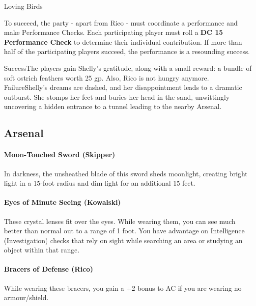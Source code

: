 \begin{DndQuestHook}[width=0.5\textwidth - 4pt]{Loving Birds}
	\DndQuestHookBasics[
		location = {Ostrich Habitat},
		quest-giver = {Shelly, the Ostrich},
		objective = {Perform for Rico's and Shelly's Date},
	]
	
	{\noindent\entryfont To succeed, the party - apart from Rico - must coordinate a performance and make Performance Checks. Each participating player must roll a \textbf{DC 15 Performance Check} to determine their individual contribution. If more than half of the participating players succeed, the performance is a resounding success.}
	
	{%
		{Success}{The players gain Shelly's gratitude, along with a small reward: a bundle of soft ostrich feathers worth 25 gp. Also, Rico is not hungry anymore.}%
		{Failure}{Shelly's dreams are dashed, and her disappointment leads to a dramatic outburst. She stomps her feet and buries her head in the sand, unwittingly uncovering a hidden entrance to a tunnel leading to the nearby Arsenal.}
	}%
\end{DndQuestHook}

\subsection*{ Arsenal}
{\entryfont \paragraph*{Moon-Touched Sword (Skipper)} In darkness, the unsheathed blade of this sword sheds moonlight, creating bright light in a 15-foot radius and dim light for an additional 15 feet.}

{\entryfont \paragraph*{Eyes of Minute Seeing (Kowalski)} These crystal lenses fit over the eyes. While wearing them, you can see much better than normal out to a range of 1 foot. You have advantage on Intelligence (Investigation) checks that rely on sight while searching an area or studying an object within that range.}

{\entryfont \paragraph*{Bracers of Defense (Rico)} While wearing these bracers, you gain a +2 bonus to AC if you are wearing no armour/shield.}

